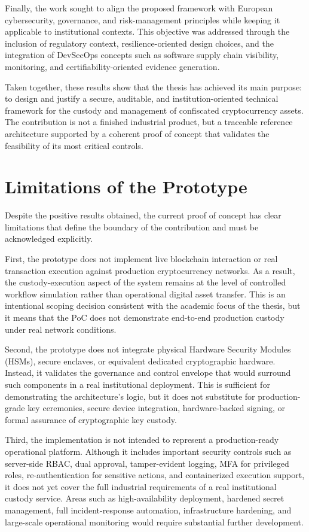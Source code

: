 \documentclass[12pt,a4paper]{report}
\begin{document}
Finally, the work sought to align the proposed framework with European cybersecurity, governance, and risk-management principles while keeping it applicable to institutional contexts. This objective was addressed through the inclusion of regulatory context, resilience-oriented design choices, and the integration of DevSecOps concepts such as software supply chain visibility, monitoring, and certifiability-oriented evidence generation.

Taken together, these results show that the thesis has achieved its main purpose: to design and justify a secure, auditable, and institution-oriented technical framework for the custody and management of confiscated cryptocurrency assets. The contribution is not a finished industrial product, but a traceable reference architecture supported by a coherent proof of concept that validates the feasibility of its most critical controls.

\section{Limitations of the Prototype}
Despite the positive results obtained, the current proof of concept has clear limitations that define the boundary of the contribution and must be acknowledged explicitly.

First, the prototype does not implement live blockchain interaction or real transaction execution against production cryptocurrency networks. As a result, the custody-execution aspect of the system remains at the level of controlled workflow simulation rather than operational digital asset transfer. This is an intentional scoping decision consistent with the academic focus of the thesis, but it means that the PoC does not demonstrate end-to-end production custody under real network conditions.

Second, the prototype does not integrate physical Hardware Security Modules (HSMs), secure enclaves, or equivalent dedicated cryptographic hardware. Instead, it validates the governance and control envelope that would surround such components in a real institutional deployment. This is sufficient for demonstrating the architecture’s logic, but it does not substitute for production-grade key ceremonies, secure device integration, hardware-backed signing, or formal assurance of cryptographic key custody.

Third, the implementation is not intended to represent a production-ready operational platform. Although it includes important security controls such as server-side RBAC, dual approval, tamper-evident logging, MFA for privileged roles, re-authentication for sensitive actions, and containerized execution support, it does not yet cover the full industrial requirements of a real institutional custody service. Areas such as high-availability deployment, hardened secret management, full incident-response automation, infrastructure hardening, and large-scale operational monitoring would require substantial further development.
\end{document}
